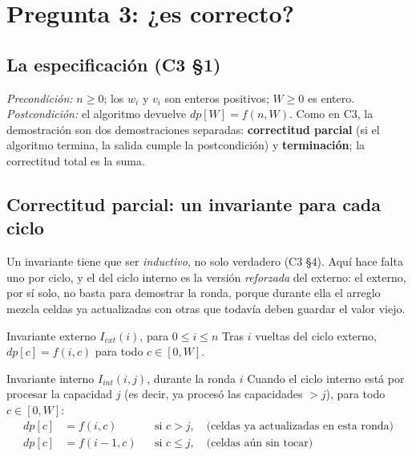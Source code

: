 \documentclass[11pt]{article}
\begin{document}
\section{Pregunta 3: ¿es correcto?}

\subsection*{La especificación (C3 §1)}

\emph{Precondición:} $n\ge0$; los $w_i$ y $v_i$ son enteros positivos; $W\ge0$ es entero.
\emph{Postcondición:} el algoritmo devuelve $dp[W]=f(n,W)$.
Como en C3, la demostración son dos demostraciones separadas: \textbf{correctitud parcial} (si el algoritmo
termina, la salida cumple la postcondición) y \textbf{terminación}; la correctitud total es la suma.

\subsection*{Correctitud parcial: un invariante para cada ciclo}

Un invariante tiene que ser \emph{inductivo}, no solo verdadero (C3 §4). Aquí hace falta uno por ciclo, y el
del ciclo interno es la versión \emph{reforzada} del externo: el externo, por sí solo, no basta para
demostrar la ronda, porque durante ella el arreglo mezcla celdas ya actualizadas con otras que todavía deben
guardar el valor viejo.

\begin{resultado}{Invariante externo $I_{ext}(i)$, para $0\le i\le n$}
Tras $i$ vueltas del ciclo externo, $dp[c]=f(i,c)$ para todo $c\in[0,W]$.
\end{resultado}

\begin{resultado}{Invariante interno $I_{int}(i,j)$, durante la ronda $i$}
Cuando el ciclo interno está por procesar la capacidad $j$ (es decir, ya procesó las capacidades $>j$), para
todo $c\in[0,W]$:
\[
\begin{aligned}
  dp[c]&=f(i,c)   &&\text{si } c>j, \quad\text{(celdas ya actualizadas en esta ronda)}\\
  dp[c]&=f(i-1,c) &&\text{si } c\le j,\quad\text{(celdas aún sin tocar)}
\end{aligned}
\]
\end{resultado}
\end{document}
